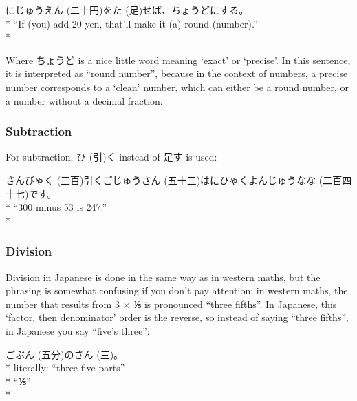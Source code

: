 \documentclass[11pt, b5paper, twoside, openright, onecolumn]{book}
\makeatletter
\newcommand*{\rubystack}[2]{{\relscale{0.5}%
  \begin{tabular}[b]{@{}c@{}}%
    {#1}\\%
   {\textscale{2}{#2}}%
  \end{tabular}}%
}
\DeclareRobustCommand*{\ruby}[2]{%
  \mbox{%
    \setlength{\parskip}{0ex}%
    \BeginAccSupp{method=pdfstringdef,ActualText={#1}}%
      \rubystack{\phantom{#2}}{#1}%
      \llap{%
        \rubystack{#2}{\phantom{#1}}%
      }%
    \EndAccSupp{}%
  }%
}
\renewcommand*{\ruby}[2]{#2 (#1)}%
\newenvironment{exampleblock}{
\setlength{\parindent}{0.6in}
\begin{minipage}[t]{\dimexpr\textwidth-\parindent}}
{\end{minipage}}
\makeatother
\begin{document}
\vspace{0.4cm}
\begin{exampleblock}
\ruby{二十円}{にじゅうえん}を\ruby{足}{た}せば、ちょうどにする。 \\* 
“If (you) add 20 yen‚ that’ll make it (a) round (number).” \\* 
\end{exampleblock}
\vspace{0.2cm}

Where ちょうど is a nice little word meaning ‘exact’ or ‘precise’. In this sentence‚ it is interpreted as “round number”‚ because in the context of numbers‚ a precise number corresponds to a ‘clean’ number‚ which can either be a round number‚ or a number without a decimal fraction.

\subsubsection{Subtraction}

For subtraction‚ \ruby{引}{ひ}く instead of 足す is used:

\vspace{0.4cm}
\begin{exampleblock}
\ruby{三百}{さんびゃく}引く\ruby{五十三}{ごじゅうさん}は\ruby{二百四十七}{にひゃくよんじゅうなな}です。 \\* 
“300 minus 53 is 247.” \\* 
\end{exampleblock}
\subsubsection{Division}


Division in Japanese is done in the same way as in western maths‚ but the phrasing is somewhat confusing if you don’t pay attention: in western maths‚ the number that results from 3 × ⅕ is pronounced “three fifths”. In Japanese‚ this ‘factor‚ then denominator’ order is the reverse‚ so instead of saying “three fifths”‚ in Japanese you say “five’s three”:

\vspace{0.4cm}
\begin{exampleblock}
\ruby{五分}{ごぶん}の\ruby{三}{さん}。 \\* 
literally: “three five-parts” \\* 
“⅗” \\* 
\end{exampleblock}
\vspace{0.2cm}
\end{document}
